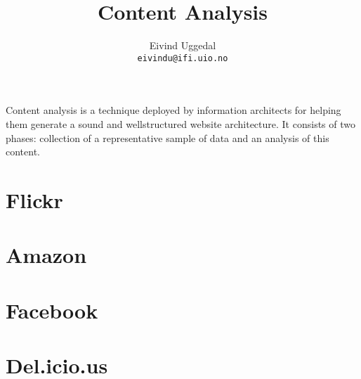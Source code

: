 \documentclass[12pt,a4paper]{article}
\title{Content Analysis}
\author{Eivind Uggedal\\
        \texttt{eivindu@ifi.uio.no}}
\date{}
\begin{document}
\maketitle{}

Content analysis is a technique deployed by information architects for helping
them generate a sound and wellstructured website architecture. It consists of
two phases: collection of a representative sample of data and an analysis of
this content.

\section{Flickr}

\section{Amazon}

\section{Facebook}

\section{Del.icio.us}
\end{document}
